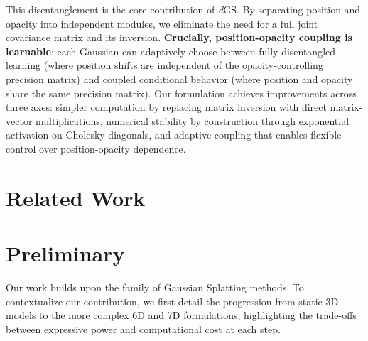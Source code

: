 \documentclass{article}
\newcommand{\modelname}{\textit{d}GS}
\begin{document}
This disentanglement is the core contribution of \modelname{}. By separating position and opacity into independent modules, we eliminate the need for a full joint covariance matrix and its inversion. \textbf{Crucially, position-opacity coupling is learnable}: each Gaussian can adaptively choose between fully disentangled learning (where position shifts are independent of the opacity-controlling precision matrix) and coupled conditional behavior (where position and opacity share the same precision matrix). Our formulation achieves improvements across three axes: simpler computation by replacing matrix inversion with direct matrix-vector multiplications, numerical stability by construction through exponential activation on Cholesky diagonals, and adaptive coupling that enables flexible control over position-opacity dependence.

\section{Related Work}
\label{sec:related_work}


\section{Preliminary}

Our work builds upon the family of Gaussian Splatting methods. To contextualize our contribution, we first detail the progression from static 3D models to the more complex 6D and 7D formulations, highlighting the trade-offs between expressive power and computational cost at each step.
\end{document}
